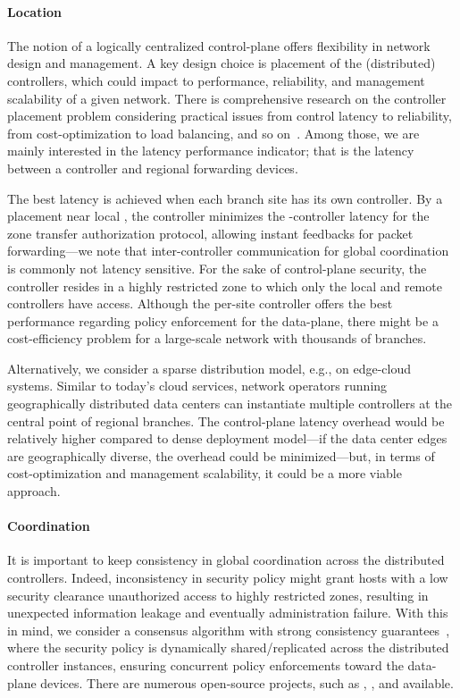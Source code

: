 \paragraph{Location}
The notion of a logically centralized control-plane offers flexibility in network design
and management. A key design choice is placement of the (distributed) controllers, which
could impact to performance, reliability, and management scalability of a given network.
There is comprehensive research on the controller placement problem considering practical
issues from control latency to reliability, from cost-optimization to load balancing, and so 
on~\cite{das2019survey,zhang2017role,he2019toward}. Among those, we are mainly interested in the 
latency performance indicator; that is the latency between a controller and regional forwarding 
devices. 

The best latency is achieved when each branch site has its own controller. By a placement 
near local \tps, the controller minimizes the \tp-controller latency for the zone 
transfer authorization protocol, allowing instant feedbacks for packet forwarding---we note
that inter-controller communication for global coordination is commonly not latency sensitive. 
For the sake of control-plane security, the controller resides in a highly restricted zone to 
which only the local \tps and remote controllers have access. Although the per-site controller
offers the best performance regarding policy enforcement for the data-plane, there might be a 
cost-efficiency problem for a large-scale network with thousands of branches.

Alternatively, we consider a sparse distribution model, e.g., on edge-cloud systems.
Similar to today's cloud services, network operators running geographically distributed
data centers can instantiate multiple controllers at the central point of regional branches. 
The control-plane latency overhead would be relatively higher compared to dense deployment 
model---if the data center edges are geographically diverse, the overhead could be 
minimized---but, in terms of cost-optimization and management scalability, it could
be a more viable approach.

\paragraph{Coordination}
It is important to keep consistency in global coordination across the distributed controllers.
Indeed, inconsistency in security policy might grant hosts with a low security 
clearance unauthorized access to highly restricted zones, resulting in unexpected information
leakage and eventually administration failure. With this in mind, we consider a consensus
algorithm with strong consistency guarantees~\cite{panda2013cap,phemius2014disco,shi2014giraffe}, 
where the security policy is dynamically shared/replicated across the distributed controller
instances, ensuring concurrent policy enforcements toward the data-plane devices. There
are numerous open-source projects, such as ,  
, and  available.

